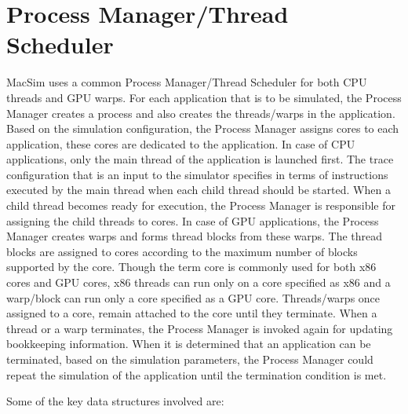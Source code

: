 \chapter{Process Manager/Thread Scheduler}
\label{sec:process_manager}

MacSim uses a common Process Manager/Thread Scheduler for both CPU threads and
GPU warps. For each application that is to be simulated, the Process Manager
creates a process and also creates the threads/warps in the application. Based
on the simulation configuration, the Process Manager assigns cores to each
application, these cores are dedicated to the application. In case of CPU
applications, only the main thread of the application is launched first. The
trace configuration that is an input to the simulator specifies in terms of instructions
executed by the main thread when each child thread should be started. When a
child thread becomes ready for execution, the Process Manager is responsible
for assigning the child threads to cores. In case of GPU applications, the
Process Manager creates warps and forms thread blocks from these warps. The
thread blocks are assigned to cores according to the maximum number of blocks
supported by the core. Though the term core is commonly used for both x86 cores
and GPU cores, x86 threads can run only on a core
specified as x86 and a warp/block can run only a core specified as a GPU core.
Threads/warps once assigned to a core, remain attached to the core until they
terminate. When a thread or a warp terminates, the Process Manager is invoked
again for updating bookkeeping information. When it is determined that an
application can be terminated, based on the simulation parameters, the Process
Manager could repeat the simulation of the application until the termination
condition is met.

Some of the key data structures involved are:

